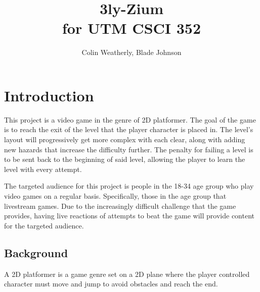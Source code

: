 \documentclass[10pt,conference,onecolumn,compsoc]{IEEEtran}
\begin{document}
\title{3ly-Zium\\ for UTM CSCI 352}
%
%


\author{Colin Weatherly, Blade Johnson%
}



\maketitle



\IEEEdisplaynontitleabstractindextext

\IEEEpeerreviewmaketitle



\section{Introduction}



This project is a video game in the genre of 2D platformer. The goal of the game is to reach the exit of the level that the player character is placed in. The level’s layout will progressively get more complex with each clear, along with adding new hazards that increase the difficulty further. The penalty for failing a level is to be sent back to the beginning of said level, allowing the player to learn the level with every attempt.

The targeted audience for this project is people in the 18-34 age group who play video games on a regular basis. Specifically, those in the age group that livestream games. Due to the increasingly difficult challenge that the game provides, having live reactions of attempts to beat the game will provide content for the targeted audience.



\subsection{Background}
A 2D platformer is a game genre set on a 2D plane where the player controlled character must move and jump to avoid obstacles and reach the end.
\end{document}
